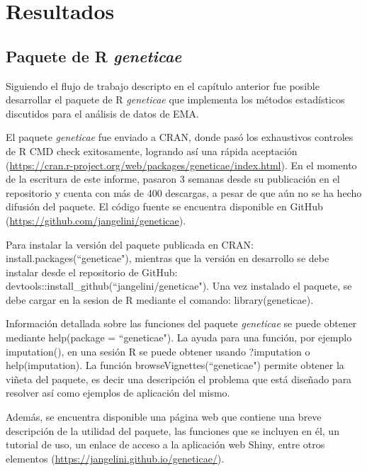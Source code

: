 \chapter{Resultados}

\section{Paquete de R \emph{geneticae}}

Siguiendo el flujo de trabajo descripto en el capítulo anterior fue posible desarrollar el paquete de R \emph{geneticae} que implementa los métodos estadísticos discutidos para el análisis de datos de EMA.

El paquete \emph{geneticae} fue enviado a CRAN, donde pasó los exhaustivos controles de R CMD check exitosamente, logrando así una rápida aceptación  (\url{https://cran.r-project.org/web/packages/geneticae/index.html}). En el momento de la escritura de este informe, pasaron 3 semanas desde su publicación en el repositorio y cuenta con más de 400 descargas, a pesar de que aún no se ha hecho difusión del paquete. El código fuente se encuentra disponible en GitHub (\url{https://github.com/jangelini/geneticae}).

Para instalar la versión del paquete publicada en CRAN:  \textcolor{fandango}{install.packages(``geneticae")}, mientras que la versión en desarrollo se debe instalar desde el repositorio de GitHub:  \textcolor{fandango}{devtools::install\_github(``jangelini/geneticae")}. Una vez instalado el paquete, se debe cargar en la sesion de R mediante el comando: \textcolor{fandango}{library(geneticae)}. 

Información detallada sobre las funciones del paquete \emph{geneticae} se puede obtener mediante \textcolor{fandango}{help(package = ``geneticae")}. La ayuda para una función, por ejemplo \textcolor{fandango}{imputation()}, en una sesión R se puede obtener usando \textcolor{fandango}{?imputation} o \textcolor{fandango}{help(imputation)}. La función \textcolor{fandango}{browseVignettes(``geneticae")} permite obtener la viñeta del paquete, es decir una descripción el problema que está diseñado para resolver así como ejemplos de aplicación del mismo. 

Además, se encuentra disponible una página web que contiene una breve descripción de la utilidad del paquete, las funciones que se incluyen en él, un tutorial de uso, un enlace de acceso a la aplicación web Shiny, entre otros elementos (\url{https://jangelini.github.io/geneticae/}).


